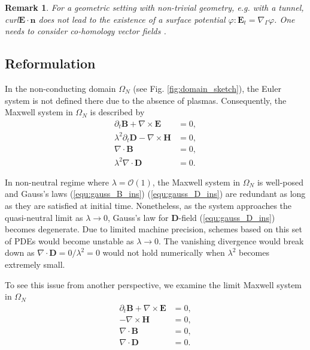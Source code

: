 \documentclass{article}
\newtheorem*{remark}{Remark}
\begin{document}
\begin{remark} For a geometric setting with non-trivial geometry, e.g. with a tunnel, \emph{curl}$\mathbf{E}\cdot\mathbf{n}$ does not lead to the existence of a surface potential $\varphi:\mathbf{E}_t = \nabla_\Gamma\varphi$. One needs to consider co-homology vector fields \cite{Hiptmair_2021}.
\end{remark}



\subsection{Reformulation} \label{sec:reform_continuous}
In the non-conducting domain $\Omega_N$ (see Fig. \ref{fig:domain_sketch}), the Euler system is not defined there due to the absence of plasmas. Consequently, the Maxwell system in $\Omega_N$ is described by
\begin{subequations}
\begin{align}
    \partial_t \mathbf{B} + \nabla \times \mathbf{E} &= 0, \label{equ:faraday_ins}\\ 
    \lambda^2 \partial_t \mathbf{D} - \nabla \times \mathbf{H} &= 0,  \label{equ:ampere_ins}\\
    \nabla \cdot \mathbf{B} &= 0, \label{equ:gauss_B_ins}\\
    \lambda^2 \nabla \cdot \mathbf{D} &= 0 \label{equ:gauss_D_ins}.
\end{align}
\end{subequations}

In non-neutral regime where $\lambda = \mathcal{O}(1)$, the Maxwell system in $\Omega_N$ is well-posed and Gauss's laws (\ref{equ:gauss_B_ins}) (\ref{equ:gauss_D_ins}) are redundant as long as they are satisfied at initial time. Nonetheless, as the system approaches the quasi-neutral limit as $\lambda \rightarrow 0$, Gauss's law for $\mathbf{D}$-field (\ref{equ:gauss_D_ins}) becomes degenerate. Due to limited machine precision, schemes based on this set of PDEs would become unstable as $\lambda \rightarrow 0$. The vanishing divergence would break down as $\nabla \cdot \mathbf{D} = 0/\lambda^2 = 0$ would not hold numerically when $\lambda^2$ becomes extremely small. 

To see this issue from another perspective, we examine the limit Maxwell system in $\Omega_N$
\begin{subequations}
\begin{align}
    \partial_t \mathbf{B} + \nabla \times \mathbf{E} &= 0, \label{equ:faraday_ins_limit}\\ 
    - \nabla \times \mathbf{H} &= 0,  \label{equ:ampere_ins_limit}\\
    \nabla \cdot \mathbf{B} &= 0, \label{equ:gauss_B_ins_limit}\\
    \nabla \cdot \mathbf{D} &= 0 \label{equ:gaus_D_ins_limit}.
\end{align}
\end{subequations}
\end{document}
